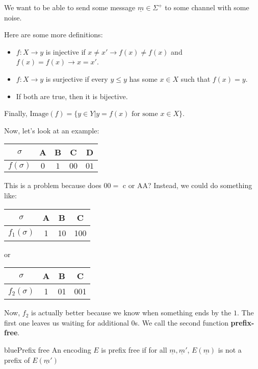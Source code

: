 \documentclass[11pt,a4paper,titlepage,dvipsnames,cmyk]{scrartcl}
\begin{document}
We want to be able to send some message $\underline m \in \Sigma^+$ to some
channel with some noise.

Here are some more definitions:
\begin{itemize}
    \item $f : X \rightarrow y$ is injective if $x \not = x' \rightarrow
        f(x) \not = f(x)$ and $f(x) = f(x) \rightarrow x = x'$.
    \item $f : X \rightarrow y$ is surjective if every $y \le y$ has some
        $x \in X$ such that $f(x) = y$.
    \item If both are true, then it is bijective.
\end{itemize}

Finally, $\text{Image}(f) = \{y \in Y | y = f(x) \text{ for some } x \in
X\}$.

Now, let's look at an example:
\begin{center}
    \begin{tabular}{c|c c c c}
        $\sigma$ & A & B & C & D \\ \hline
        $f(\sigma)$ & $0$ & $1$ & $00$ & $01$
    \end{tabular}
\end{center}

This is a problem because does $00 =$ c or AA? Instead, we could do
something like:

\begin{center}
    \begin{tabular}{c|c c c}
        $\sigma$ & A & B & C \\ \hline
        $f_1(\sigma)$ & 1 & 10 & 100
    \end{tabular}
    \quad or \quad
    \begin{tabular}{c|c c c}
        $\sigma$ & A & B & C \\ \hline
        $f_2(\sigma)$ & 1 & 01 & 001
    \end{tabular}
\end{center}

Now, $f_2$ is actually better because we know when something ends by the
$1$. The first one leaves us waiting for additional $0$s. We call the
second function \textbf{prefix-free}.

\begin{titlebox}{blue}{Prefix free}
An encoding $E$ is prefix free if for all $\underline m, \underline m'$,
$E(\underline m)$ is not a prefix of $E(\underline m')$
\end{titlebox}
\end{document}
